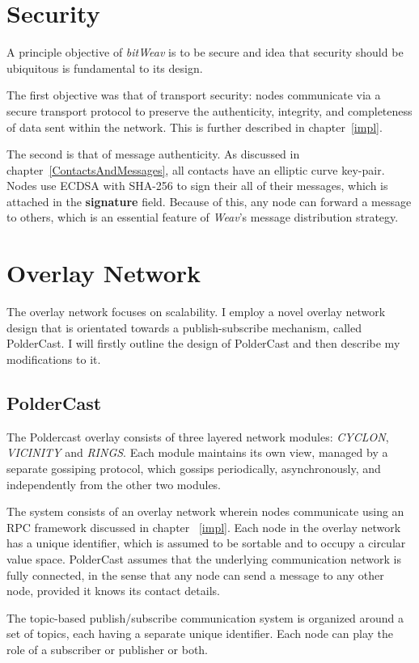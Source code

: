 \documentclass[10pt,a4paper,onecolumn]{article}
\begin{document}
\section{Security}
\label{security}
A principle objective of \textit{bitWeav} is to be secure and idea that security should be ubiquitous is fundamental to its design.

The first objective was that of transport security: nodes communicate via a secure transport protocol to preserve the authenticity, integrity, and completeness of data sent within the network. This is further described in chapter~\ref{impl}. 

The second is that of message authenticity. As discussed in chapter~\ref{ContactsAndMessages}, all contacts have an elliptic curve key-pair. Nodes use ECDSA with SHA-256 to sign their all of their messages, which is attached in the \textbf{signature} field. Because of this, any node can forward a message to others, which is an essential feature of \textit{Weav}'s message distribution strategy.

\section{Overlay Network}
\label{network}
The overlay network focuses on scalability. I employ a novel overlay network design that is orientated towards a publish-subscribe mechanism, called PolderCast. I will firstly outline the design of PolderCast and then describe my modifications to it.

\subsection*{PolderCast}
The Poldercast overlay consists of three layered network modules: \emph{CYCLON}, \emph{VICINITY} and \emph{RINGS}. Each module maintains its own view, managed by a separate gossiping protocol, which gossips periodically, asynchronously, and independently from the other two modules.

The system consists of an overlay network wherein nodes communicate using an RPC framework discussed in chapter ~\ref{impl}. Each node in the overlay network has a unique identifier, which is assumed to be sortable and to occupy a circular value space. PolderCast assumes that the underlying communication network is fully connected, in the sense that any node can send a message to any other node, provided it knows its contact details. 

The topic-based publish/subscribe communication system is organized around a set of topics, each having a separate unique identifier. Each node can play the role of a subscriber or publisher or both.
\end{document}
